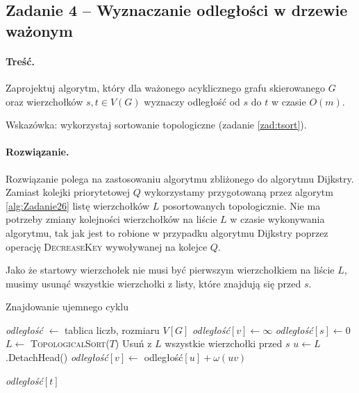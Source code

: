 \subsection{Zadanie 4 -- Wyznaczanie odległości w drzewie ważonym}
\paragraph{Treść.}Zaprojektuj algorytm, który dla ważonego 
acyklicznego grafu skierowanego $G$ oraz wierzchołków $s, t \in
V(G)$ wyznaczy odległość od $s$ do $t$ w czasie $O(m)$. 

Wskazówka: wykorzystaj sortowanie topologiczne (zadanie \ref{zad:tsort}).

\paragraph{Rozwiązanie.}
Rozwiązanie polega na zastosowaniu algorytmu zbliżonego do
algorytmu Dijkstry. Zamiast 
kolejki priorytetowej $Q$ wykorzystamy przygotowaną przez algorytm 
\ref{alg:Zadanie26} listę wierzchołków $L$ posortowanych topologicznie.
Nie ma potrzeby zmiany kolejności wierzchołków na liście $L$ w czasie 
wykonywania algorytmu, tak jak jest to robione w przypadku algorytmu
Dijkstry poprzez operację \textsc{DecreaseKey} wywoływanej na kolejce $Q$.

Jako że startowy wierzchołek nie musi być pierwszym wierzchołkiem na liście $L$,
musimy usunąć wszystkie wierzchołki z listy, które znajdują się przed $s$.

\begin{algorithm}[H]
	\caption{Znajdowanie ujemnego cyklu}
	\begin{algorithmic}[1]
		\State \textit{odległość} $\gets$ tablica liczb, rozmiaru $V[G]$
		\State \textit{odległość}$[v] \gets \infty$
		\EndFor
		\State \textit{odległość}$[s] \gets 0$
		\State $L \gets$ \textsc{TopologicalSort}($T$) 
		\State Usuń z $L$ wszystkie wierzchołki przed $s$
		\State $u \gets L$.DetachHead()
		\State \textit{odległość}$[v] \gets $ {odległość}$[u] + \omega(uv)$

		\EndIf
		\EndFor
		\EndWhile
		\State \Return \textit{odległość}$[t]$
		\EndProcedure
	\end{algorithmic}
	\label{Zadanie34}
\end{algorithm}

